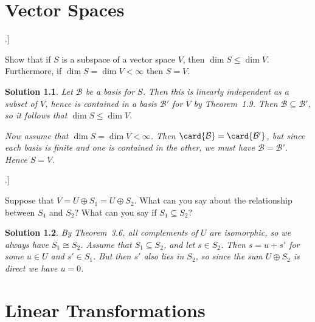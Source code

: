 \documentclass[article, a4paper, 11pt, oneside]{memoir}
\title{\doctitle}
\author{\docauthor}
\numberwithin{equation}{chapter}
\newcommand{\calB}{\mathcal{B}}
\renewenvironment{exerciseframed}[1][]{%
    \setsepchar{.}%
    \readlist*\mylist{#1}%
    \def\exlabel{\mylist[1].\mylist[2]}%
    \begin{exerciseframed*}[\exlabel]%
    \label{ex:#1}%
}{%
    \end{exerciseframed*}%
}
\theoremstyle{nonumberplain}
\newtheorem{solution}{Solution}
\begin{document}
\maketitle

\chapter{Vector Spaces}

\begin{exerciseframed}[1.11]
    Show that if $S$ is a subspace of a vector space $V$, then $\dim S \leq \dim V$. Furthermore, if $\dim S = \dim V < \infty$ then $S = V$.
\end{exerciseframed}

\begin{solution}
    Let $\calB$ be a basis for $S$. Then this is linearly independent as a subset of $V$, hence is contained in a basis $\calB'$ for $V$ by Theorem~1.9. Then $\calB \subseteq \calB'$, so it follows that $\dim S \leq \dim V$.

    Now assume that $\dim S = \dim V < \infty$. Then $\card{\calB} = \card{\calB'}$, but since each basis is finite and one is contained in the other, we must have $\calB = \calB'$. Hence $S = V$.
\end{solution}


\begin{exerciseframed}[1.12]
    Suppose that $V = U \oplus S_1 = U \oplus S_2$. What can you say about the relationship between $S_1$ and $S_2$? What can you say if $S_1 \subseteq S_2$?
\end{exerciseframed}

\begin{solution}
    By Theorem~3.6, all complements of $U$ are isomorphic, so we always have $S_1 \cong S_2$. Assume that $S_1 \subseteq S_2$, and let $s \in S_2$. Then $s = u + s'$ for some $u \in U$ and $s' \in S_1$. But then $s'$ also lies in $S_2$, so since the sum $U \oplus S_2$ is direct we have $u = 0$.
\end{solution}


\chapter{Linear Transformations}

\newcommand{\im}{\operatorname{im}}
\newcommand{\calL}{\mathcal{L}}
\end{document}
